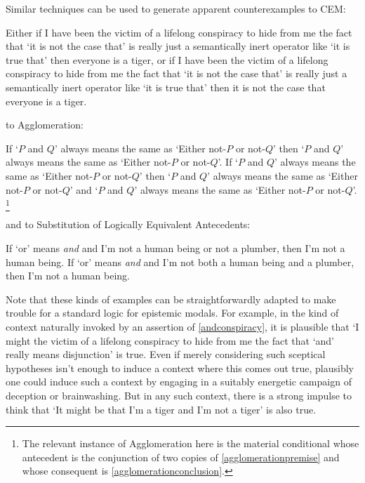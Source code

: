 \documentclass[If.tex]{subfiles}
\begin{document}
Similar techniques can be used to generate apparent counterexamples to CEM:
\begin{prop}
	\nitem
	Either if I have been the victim of a lifelong conspiracy to hide from me the fact that ‘it is not the case that’ is really just a semantically inert operator like ‘it is true that’ then everyone is a tiger, or if I have been the victim of a lifelong conspiracy to hide from me the fact that ‘it is not the case that’ is really just a semantically inert operator like ‘it is true that’ then it is not the case that everyone is a tiger.
\end{prop}
to Agglomeration: 
\begin{prop}
	\nitem
	\begin{prop}
		\aitem \label{agglomerationpremise}
		If ‘$P$ and $Q$’ always means the same as ‘Either not-$P$ or not-$Q$’ then ‘$P$ and $Q$’ always means the same as ‘Either not-$P$ or not-$Q$’.
		\aitem \label{agglomerationconclusion}
		If ‘$P$ and $Q$’ always means the same as ‘Either not-$P$ or not-$Q$’ then ‘$P$ and $Q$’ always means the same as ‘Either not-$P$ or not-$Q$’ and ‘$P$ and $Q$’ always means the same as ‘Either not-$P$ or not-$Q$’.%
		\footnote{The relevant instance of Agglomeration here is the material conditional whose antecedent is the conjunction of two copies of \ref{agglomerationpremise} and whose consequent is \ref{agglomerationconclusion}.}
	\end{prop}
\end{prop}
and to Substitution of Logically Equivalent Antecedents:
\begin{prop}
	\nitem
	\begin{prop}
		\aitem
		If ‘or’ means \emph{and} and I'm not a human being or not a plumber, then I'm not a human being.
		\aitem
		If ‘or’ means \emph{and} and I'm not both a human being and a plumber, then I'm not a human being.  	
	\end{prop}
\end{prop}


Note that these kinds of examples can be straightforwardly adapted to make trouble for a standard logic for epistemic modals.  For example, in the kind of context naturally invoked by an assertion of \ref{andconspiracy}, it is plausible that ‘I might the victim of a lifelong conspiracy to hide from me the fact that ‘and’ really means disjunction’ is true.  Even if merely considering such sceptical hypotheses isn't enough to induce a context where this comes out true, plausibly one could induce such a context by engaging in a suitably energetic campaign of deception or brainwashing.  But in any such context, there is a strong impulse to think that ‘It might be that I'm a tiger and I'm not a tiger’ is also true.
\end{document}
